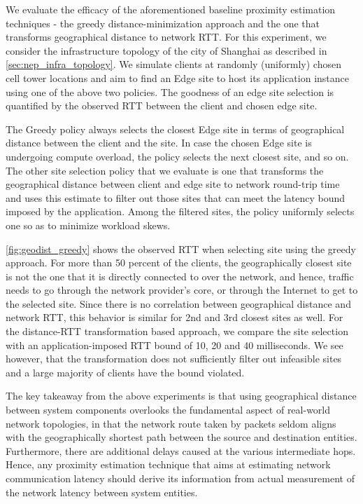 \par We evaluate the efficacy of the aforementioned baseline proximity estimation techniques - the greedy distance-minimization approach and the one that transforms geographical distance to network RTT. For this experiment, we consider the infrastructure topology of the city of Shanghai as described in \cref{sec:nep_infra_topology}. We simulate clients at randomly (uniformly) chosen cell tower locations and aim to find an Edge site to host its application instance using one of the above two policies. The goodness of an edge site selection is quantified by the observed RTT between the client and chosen edge site. 
\par The Greedy policy always selects the closest Edge site in terms of geographical distance between the client and the site. In case the chosen Edge site is undergoing compute overload, the policy selects the next closest site, and so on. The other site selection policy that we evaluate is one that transforms the geographical distance between client and edge site to network round-trip time and uses this estimate to filter out those sites that can meet the latency bound imposed by the application. Among the filtered sites, the policy uniformly selects one so as to minimize workload skews.
\par \cref{fig:geodist_greedy} shows the observed RTT when selecting site using the greedy approach. For more than 50 percent of the clients, the geographically closest site is not the one that it is directly connected to over the network, and hence, traffic needs to go through the network provider's core, or through the Internet to get to the selected site. Since there is no correlation between geographical distance and network RTT, this behavior is similar for 2nd and 3rd closest sites as well. For the distance-RTT transformation based approach, we compare the site selection with an application-imposed RTT bound of 10, 20 and 40 milliseconds. We see however, that the transformation does not sufficiently filter out infeasible sites and a large majority of clients have the bound violated.
\par The key takeaway from the above experiments is that using geographical distance between system components overlooks the fundamental aspect of real-world network topologies, in that the network route taken by packets seldom aligns with the geographically shortest path between the source and destination entities. Furthermore, there are additional delays caused at the various intermediate hops. Hence, any proximity estimation technique that aims at estimating network communication latency should derive its information from actual measurement of the network latency between system entities.

